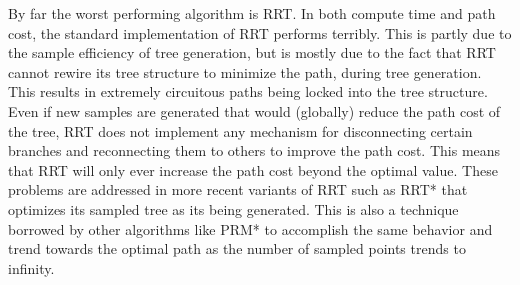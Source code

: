 By far the worst performing algorithm is RRT. In both compute time and path cost, the standard implementation of RRT performs terribly. This is partly due to the sample efficiency of tree generation, but is mostly due to the fact that RRT cannot rewire its tree structure to minimize the path, during tree generation. This results in extremely circuitous paths being locked into the tree structure. Even if new samples are generated that would (globally) reduce the path cost of the tree, RRT does not implement any mechanism for disconnecting certain branches and reconnecting them to others to improve the path cost. This means that RRT will only ever increase the path cost beyond the optimal value. These problems are addressed in more recent variants of RRT such as RRT* that optimizes its sampled tree as its being generated. This is also a technique borrowed by other algorithms like PRM* to accomplish the same behavior and trend towards the optimal path as the number of sampled points trends to infinity. 